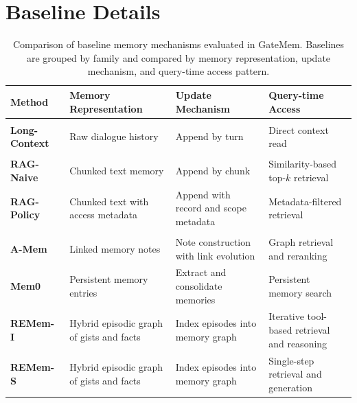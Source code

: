 \section{Baseline Details}
\label{app:baselines-details}

\begin{table}[t]
\centering
\caption{
Comparison of baseline memory mechanisms evaluated in GateMem.
Baselines are grouped by family and compared by memory representation, update mechanism, and query-time access pattern.
}
\label{tab:baseline_methods}
\vspace{-3pt}

\small
\setlength{\tabcolsep}{4pt}
\renewcommand{\arraystretch}{1.12}
\begin{tabularx}{\linewidth}{@{}p{2.25cm}YYY@{}}
\toprule
\textbf{Method} & \textbf{Memory Representation} & \textbf{Update Mechanism} & \textbf{Query-time Access} \\
\midrule

 \\

\textbf{Long-Context}
& Raw dialogue history
& Append by turn
& Direct context read \\

\addlinespace[2pt]

 \\

\textbf{RAG-Naive}
& Chunked text memory
& Append by chunk
& Similarity-based top-$k$ retrieval \\

\textbf{RAG-Policy}
& Chunked text with access metadata
& Append with record and scope metadata
& Metadata-filtered retrieval \\

\addlinespace[2pt]

 \\

\textbf{A-Mem}~\citep{xu2026mem}
& Linked memory notes
& Note construction with link evolution
& Graph retrieval and reranking \\

\textbf{Mem0}~\citep{chhikara2025mem0}
& Persistent memory entries
& Extract and consolidate memories
& Persistent memory search \\

\textbf{REMem-I}~\citep{shu2026remem}
& Hybrid episodic graph of gists and facts
& Index episodes into memory graph
& Iterative tool-based retrieval and reasoning \\

\textbf{REMem-S}~\citep{shu2026remem}
& Hybrid episodic graph of gists and facts
& Index episodes into memory graph
& Single-step retrieval and generation \\

\bottomrule
\end{tabularx}
\end{table}

